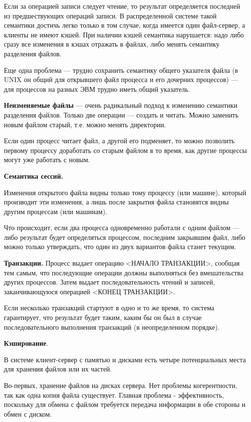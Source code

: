 Если за операцией записи следует чтение, то результат определяется последней из предшествующих операций записи.
В распределенной системе такой семантики достичь легко только в том случае, когда имеется один файл-сервер, а клиенты не имеют кэшей.
При наличии кэшей семантика нарушается: надо либо сразу все изменения в кэшах отражать в файлах, либо менять семантику разделения файлов.

Еще одна проблема --- трудно сохранить семантику общего указателя файла (в UNIX он общий для открывшего файл процесса и его дочерних процессов) --- для процессов на разных ЭВМ трудно иметь общий указатель.

\textbf{Неизменяемые файлы} --- очень радикальный подход к изменению семантики разделения файлов.
Только две операции --- создать и читать.
Можно заменить новым файлом старый, т.е. можно менять директории.

Если один процесс читает файл, а другой его подменяет, то можно позволить первому процессу доработать со старым файлом в то время, как другие процессы могут уже работать с новым.

\textbf{Семантика сессий.}

Изменения открытого файла видны только тому процессу (или машине), который производит эти изменения, а лишь после закрытия файла становятся видны другим процессам (или машинам).

Что происходит, если два процесса одновременно работали с одним файлом --- либо результат будет определяться процессом, последним закрывшим файл, либо можно только утверждать, что один из двух вариантов файла станет текущим.

\textbf{Транзакции.}
Процесс выдает операцию <НАЧАЛО ТРАНЗАКЦИИ>, сообщая тем самым, что последующие операции должны выполняться без вмешательства других процессов.
Затем выдает последовательность чтений и записей, заканчивающуюся операцией <КОНЕЦ ТРАНЗАКЦИИ>.

Если несколько транзакций стартуют в одно и то же время, то система гарантирует, что результат будет таким, каким бы он был в случае последовательного выполнения транзакций (в неопределенном порядке).

\textbf{Кэширование}.

В системе клиент-сервер с памятью и дисками есть четыре потенциальных места для хранения файлов или их частей.

Во-первых, хранение файлов на дисках сервера.
Нет проблемы когерентности, так как одна копия файла существует.
Главная проблема - эффективность, поскольку для обмена с файлом требуется передача информации в обе стороны и обмен с диском.

